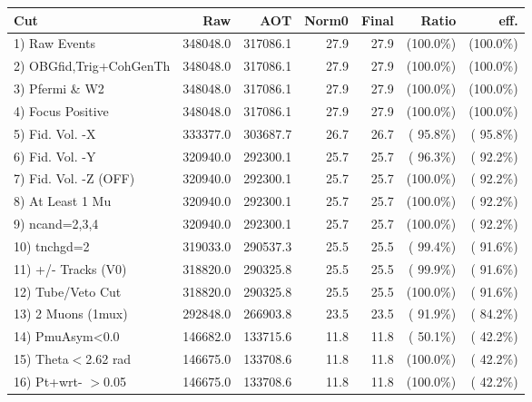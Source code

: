  \begin{table}[h!]\centering
 \begin{tabular}{||l||r|r|r|r|r|r||}
 \hline
 \hline
 Cut & Raw & AOT & Norm0 & Final & Ratio & eff.       \\
 \hline
  1) Raw Events           &     348048.0 &     317086.1 &         27.9 &         27.9 & (100.0\%) & (100.0\%) \\
  2) OBGfid,Trig+CohGenTh &     348048.0 &     317086.1 &         27.9 &         27.9 & (100.0\%) & (100.0\%) \\
  3) Pfermi \& W2         &     348048.0 &     317086.1 &         27.9 &         27.9 & (100.0\%) & (100.0\%) \\
  4) Focus Positive       &     348048.0 &     317086.1 &         27.9 &         27.9 & (100.0\%) & (100.0\%) \\
  5) Fid. Vol. -X         &     333377.0 &     303687.7 &         26.7 &         26.7 & ( 95.8\%) & ( 95.8\%) \\
  6) Fid. Vol. -Y         &     320940.0 &     292300.1 &         25.7 &         25.7 & ( 96.3\%) & ( 92.2\%) \\
  7) Fid. Vol. -Z (OFF)   &     320940.0 &     292300.1 &         25.7 &         25.7 & (100.0\%) & ( 92.2\%) \\
  8) At Least 1 Mu        &     320940.0 &     292300.1 &         25.7 &         25.7 & (100.0\%) & ( 92.2\%) \\
  9) ncand=2,3,4          &     320940.0 &     292300.1 &         25.7 &         25.7 & (100.0\%) & ( 92.2\%) \\
 10) tnchgd=2             &     319033.0 &     290537.3 &         25.5 &         25.5 & ( 99.4\%) & ( 91.6\%) \\
 11) +/- Tracks (V0)      &     318820.0 &     290325.8 &         25.5 &         25.5 & ( 99.9\%) & ( 91.6\%) \\
 12) Tube/Veto Cut        &     318820.0 &     290325.8 &         25.5 &         25.5 & (100.0\%) & ( 91.6\%) \\
 13) 2 Muons (1mux)       &     292848.0 &     266903.8 &         23.5 &         23.5 & ( 91.9\%) & ( 84.2\%) \\
 14) PmuAsym<0.0          &     146682.0 &     133715.6 &         11.8 &         11.8 & ( 50.1\%) & ( 42.2\%) \\
 15) Theta$<$2.62 rad     &     146675.0 &     133708.6 &         11.8 &         11.8 & (100.0\%) & ( 42.2\%) \\
 16) Pt+wrt- $>$0.05      &     146675.0 &     133708.6 &         11.8 &         11.8 & (100.0\%) & ( 42.2\%) \\

\end{tabular}
\end{table}
